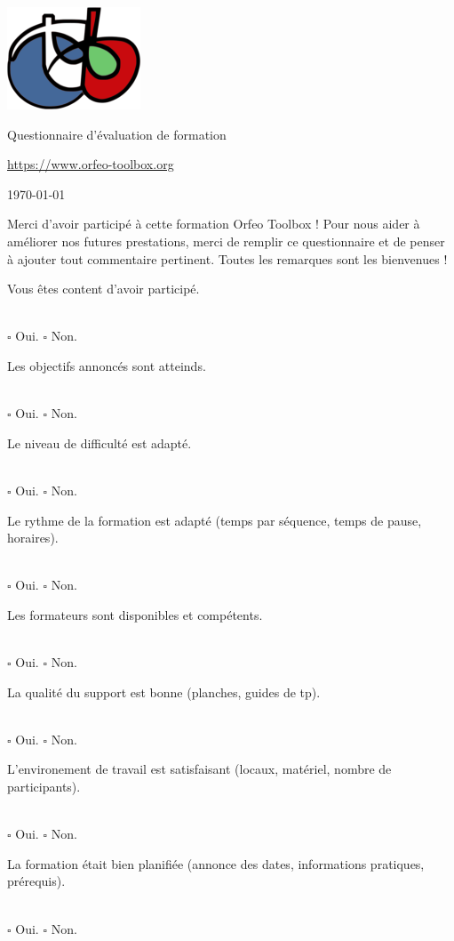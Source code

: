 \documentclass[10pt,a4paper]{article}
\begin{document}
\begin{center}
\includegraphics[scale=0.5]{Art/otb-logo.png}

Questionnaire d'évaluation de formation

{\small\url{https://www.orfeo-toolbox.org}}

\today
\end{center}

\begin{center}
\begin{minipage}{.8\textwidth}
Merci d'avoir participé à cette formation Orfeo Toolbox ! Pour nous aider à
améliorer nos futures prestations, merci de remplir ce questionnaire et de
penser à ajouter tout commentaire pertinent. Toutes les remarques sont les
bienvenues !
\end{minipage}
\end{center}

\newcommand{\answer}{
\\ \quad $\square$ Oui. \quad $\square$ Non.\\
\vspace{4em}
}

Vous êtes content d'avoir participé.
\answer

Les objectifs annoncés sont atteinds.
\answer

Le niveau de difficulté est adapté.
\answer

Le rythme de la formation est adapté (temps par séquence, temps de pause,
horaires).
\answer

Les formateurs sont disponibles et compétents.
\answer

La qualité du support est bonne (planches, guides de tp).
\answer

L'environement de travail est satisfaisant (locaux, matériel, nombre de
participants).
\answer

La formation était bien planifiée (annonce des dates, informations pratiques,
prérequis).
\answer

\newcommand{\moduleanswer}{
\\
\begin{tabular}{rlll}  
  Difficultée:         & $\square$ Adaptée & $\square$ Difficile & $\square$
  Facile\\
  Temps alloué:       & $\square$ Adapté  & $\square$ Manque de temps pour tout
  faire & $\square$ Manque de choses à faire\\
  Qualité du support: & $\square$ Bonne & $\square$ À améliorer: & \\
  Commentaire: &&&\\
\end{tabular}
\vspace{4em}
}
\end{document}
